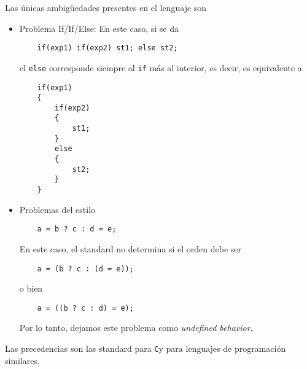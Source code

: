 \documentclass[12pt]{article}
\newcommand{\C}{\texttt{C}}
\begin{document}
Las \'unicas ambig\"uedades presentes en el lenguaje son
\begin{itemize}
    \item Problema If/If/Else: En este caso, si se da
    \begin{verbatim}
    if(exp1) if(exp2) st1; else st2;
    \end{verbatim}
    el \texttt{else} corresponde siempre al \texttt{if} m\'as al interior, es decir, es equivalente a
    \begin{verbatim}
    if(exp1)
    {
        if(exp2)
        {
            st1;
        }
        else
        {
            st2;
        }
    }
    \end{verbatim}
    \item Problemas del estilo
    \begin{verbatim}
    a = b ? c : d = e;
    \end{verbatim}
    En este caso, el standard no determina si el orden debe ser
    \begin{verbatim}
    a = (b ? c : (d = e));
    \end{verbatim}
    o bien
    \begin{verbatim}
    a = ((b ? c : d) = e);
    \end{verbatim}
    Por lo tanto, dejamos este problema como \textit{undefined behavior}.
\end{itemize}

Las precedencias son las standard para \C y para lenguajes de programaci\'on similares.
\end{document}
